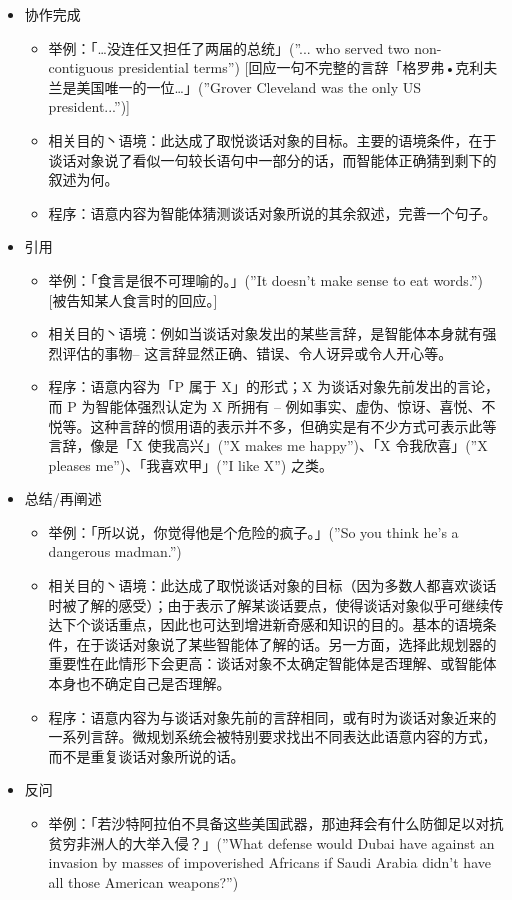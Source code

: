 \begin{itemize}
\item 协作完成
\begin{itemize}
\item 举例：「…没连任又担任了两届的总统」(”... who served two non-contiguous presidential terms”) [回应一句不完整的言辞「格罗弗•克利夫兰是美国唯一的一位…」(”Grover Cleveland was the only US president...”)] 
\item 相关目的丶语境：此达成了取悦谈话对象的目标。主要的语境条件，在于谈话对象说了看似一句较长语句中一部分的话，而智能体正确猜到剩下的叙述为何。
\item 程序：语意内容为智能体猜测谈话对象所说的其余叙述，完善一个句子。
\end{itemize}
\item 引用
\begin{itemize}
\item 举例：「食言是很不可理喻的。」(”It doesn’t make sense to eat words.”) [被告知某人食言时的回应。] 
\item 相关目的丶语境：例如当谈话对象发出的某些言辞，是智能体本身就有强烈评估的事物– 这言辞显然正确、错误、令人讶异或令人开心等。 
\item 程序：语意内容为「P 属于 X」的形式；X 为谈话对象先前发出的言论，而 P 为智能体强烈认定为 X 所拥有 – 例如事实、虚伪、惊讶、喜悦、不悦等。这种言辞的惯用语的表示并不多，但确实是有不少方式可表示此等言辞，像是「X 使我高兴」(”X makes me happy”)、「X 令我欣喜」(”X pleases me”)、「我喜欢甲」(”I like X”) 之类。
\end{itemize}
\item 总结/再阐述
\begin{itemize}
\item 举例：「所以说，你觉得他是个危险的疯子。」(”So you think he’s a dangerous madman.”)
\item 相关目的丶语境：此达成了取悦谈话对象的目标（因为多数人都喜欢谈话时被了解的感受）；由于表示了解某谈话要点，使得谈话对象似乎可继续传达下个谈话重点，因此也可达到增进新奇感和知识的目的。基本的语境条件，在于谈话对象说了某些智能体了解的话。另一方面，选择此规划器的重要性在此情形下会更高：谈话对象不太确定智能体是否理解、或智能体本身也不确定自己是否理解。 
\item 程序：语意内容为与谈话对象先前的言辞相同，或有时为谈话对象近来的一系列言辞。微规划系统会被特别要求找出不同表达此语意内容的方式，而不是重复谈话对象所说的话。
\end{itemize}
\item 反问
\begin{itemize}
\item 举例：「若沙特阿拉伯不具备这些美国武器，那迪拜会有什么防御足以对抗贫穷非洲人的大举入侵？」(”What defense would Dubai have against an invasion by masses of impoverished Africans if Saudi Arabia didn’t have all those American weapons?”)

\end{itemize}
\end{itemize}
